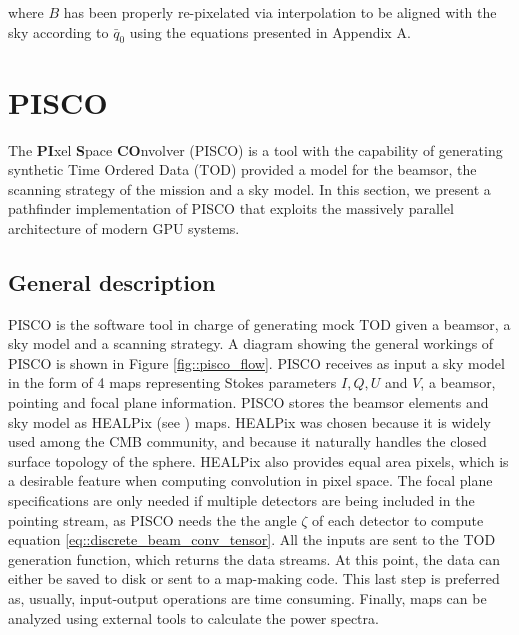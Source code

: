 \documentclass[a4paper,11pt]{article}
\begin{document}
\noindent
where $B$ has been properly re-pixelated via interpolation to be aligned with the sky according to $\bar{q}_0$ using the equations presented in Appendix A.

\section{PISCO}
\label{sec::pisco}

The \textbf{PI}xel \textbf{S}pace \textbf{CO}nvolver (PISCO) is a tool with the capability of generating synthetic Time Ordered Data (TOD) provided a model for the beamsor, the scanning strategy of the mission and a sky model. In this section, we present a pathfinder implementation of PISCO that exploits the massively parallel architecture of modern GPU systems.

\subsection{General description}

PISCO is the software tool in charge of generating mock TOD given a beamsor, a sky model and a scanning strategy. A diagram showing the general workings of PISCO is shown in Figure \ref{fig::pisco_flow}. PISCO receives as input a sky model in the form of 4 maps representing Stokes parameters $I,Q,U$ and $V$, a beamsor, pointing and focal plane information. PISCO stores the beamsor elements and sky model as HEALPix (see \cite{2005ApJ...622..759G}) maps. HEALPix was chosen because it is widely used among the CMB community, and because it naturally handles the closed surface topology of the sphere. HEALPix also provides equal area pixels, which is a desirable feature when computing convolution in pixel space. The focal plane specifications are only needed if multiple detectors are being included in the pointing stream, as PISCO needs the the angle $\zeta$ of each detector to compute equation \ref{eq::discrete_beam_conv_tensor}. All the inputs are sent to the TOD generation function, which returns the data streams. At this point, the data can either be saved to disk or sent to a map-making code. This last step is preferred as, usually, input-output operations are time consuming. Finally, maps can be analyzed using external tools to calculate the power spectra.
\end{document}
